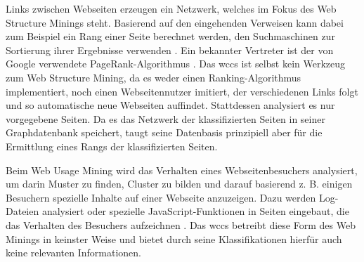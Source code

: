        Links zwischen Webseiten erzeugen ein Netzwerk,
        welches im Fokus des Web Structure Minings steht.
        Basierend auf den eingehenden Verweisen kann dabei zum Beispiel
        ein Rang einer Seite berechnet werden,
        den Suchmaschinen zur Sortierung ihrer Ergebnisse verwenden
        \cite[Part I]{markov:webMining}.
        Ein bekannter Vertreter ist der von Google verwendete PageRank-Algorithmus
        \cite{page:pageRank}.
        Das \gls{wccs} ist selbst kein Werkzeug zum Web Structure Mining,
        da es weder einen Ranking-Algorithmus implementiert,
        noch einen Webseitennutzer imitiert, der verschiedenen Links folgt
        und so automatische neue Webseiten auffindet.
        Stattdessen analysiert es nur vorgegebene Seiten.
        Da es das Netzwerk der klassifizierten Seiten in seiner Graphdatenbank speichert,
        taugt seine Datenbasis prinzipiell aber für die Ermittlung eines Rangs
        der klassifizierten Seiten.

        Beim Web Usage Mining wird das Verhalten eines Webseitenbesuchers analysiert,
        um darin Muster zu finden, Cluster zu bilden und darauf basierend z. B.
        einigen Besuchern spezielle Inhalte auf einer Webseite anzuzeigen.
        Dazu werden Log-Dateien analysiert oder spezielle JavaScript-Funktionen
        in Seiten eingebaut, die das Verhalten des Besuchers aufzeichnen
        \cite[Part III]{markov:webMining}.
        Das \gls{wccs} betreibt diese Form des Web Minings in keinster Weise
        und bietet durch seine Klassifikationen hierfür auch keine relevanten Informationen.

